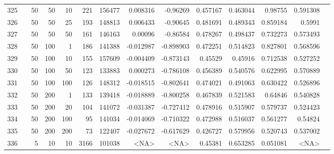 \begin{longtable}{llrrrrrrrrrrrr}
		325 & &           50 &                50 &           10 &         221 &     156477 &  0.008316 &  -0.96269 &  0.457167 &    0.463044 &        0.98755 &  0.591308 \\
		326 & \multirow[b]{10}{*}{\rotatebox[origin=l]{90}{sbert-tf-idf-weighted}} &           50 &                50 &           25 &         193 &     148813 &  0.006433 &  -0.90645 &  0.481691 &    0.489343 &       0.859184 &    0.5991 \\
		327 & &           50 &                50 &           50 &         161 &     146163 &   0.00096 &  -0.86584 &  0.478267 &    0.498437 &       0.732273 &  0.573493 \\
		328 & &           50 &               100 &            1 &         186 &     141388 & -0.012987 & -0.898903 &  0.472251 &    0.514823 &       0.827801 &  0.568596 \\
		329 & &           50 &               100 &           10 &         155 &     157609 & -0.004409 & -0.873143 &   0.45529 &     0.45916 &       0.712538 &  0.527252 \\
		330 & &           50 &               100 &           50 &         123 &     133883 &  0.000273 & -0.786108 &  0.456389 &    0.540576 &       0.622995 &  0.570889 \\
		331 & &           50 &               100 &          100 &         126 &     148312 & -0.018515 & -0.802641 &  0.474021 &    0.491063 &       0.630422 &  0.526896 \\
		332 & &           50 &               200 &            1 &         133 &     139418 & -0.018889 & -0.800258 &  0.467839 &    0.521583 &        0.64846 &  0.540828 \\
		333 & &           50 &               200 &           20 &         104 &     141072 & -0.031387 & -0.727412 &  0.478916 &    0.515907 &       0.579737 &  0.524423 \\
		334 & &           50 &               200 &          100 &          95 &     141034 & -0.014069 & -0.710322 &  0.472988 &    0.516037 &       0.561277 &   0.54824 \\
		335 & &           50 &               200 &          200 &          73 &     122407 & -0.027672 & -0.617629 &  0.426727 &    0.579956 &       0.520743 &  0.537002 \\\midrule
		336 & \multirow[t]{74}{*}{\rotatebox[origin=r]{90}{tfidf}} &            5 &                10 &           10 &        3166 &     101038 &      <NA> &      <NA> &   0.45381 &    0.653285 &       0.051081 &  <NA> \\

\end{longtable}

